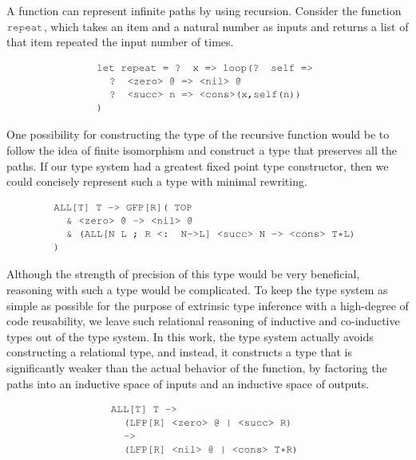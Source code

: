 \documentclass[acmsmall]{acmart}
\theoremstyle{definition}
\begin{document}
A function can represent infinite paths by using recursion.
Consider the function $\J{repeat}$, which takes an item and a natural number
as inputs and returns a list of that item repeated the input number of times.

\[
  \begin{array}[t]{@{} l}
      \J{let repeat = ? x => loop(? self =>}
      \\
      \I \J{? <zero> @ => <nil> @}
      \\
      \I \J{? <succ> n => <cons>(x,self(n))}
      \\
      \J{)}
  \end{array}
\]

\noindent
One possibility for constructing the type of the recursive function would
be to follow the idea of finite isomorphism and construct a type 
that preserves all the paths. If our type system had a greatest fixed point
type constructor, then we could concisely represent such a type with minimal
rewriting.

\[
  \begin{array}[t]{@{} l}
      \J{ALL[T] T -> GFP[R]( TOP} 
      \\
      \I \J{\& <zero> @ -> <nil> @}
      \\
      \I \J{\& (ALL[N L ; R <: N->L] <succ> N -> <cons> T*L)}
      \\
      \J{)} 
  \end{array}
\]

\noindent
Although the strength of precision of this type would be very beneficial,
reasoning with such a type would be complicated. To keep the type system as
simple as possible for the purpose of extrinsic type inference with a high-degree
of code reusability, we leave such relational reasoning of inductive and co-inductive types out of
the type system. 
In this work, the type system actually avoids constructing a relational type, and instead, it
constructs a type that is significantly weaker than the actual behavior of the function,
by factoring the paths into an inductive space of inputs and an inductive space of outputs. 

\[
  \begin{array}[t]{@{} l}
      \J{ALL[T] T ->} 
      \\
      \I \J{(LFP[R] <zero> @ | <succ> R)}
      \\
      \I \J{->}
      \\
      \I \J{(LFP[R] <nil> @ | <cons> T*R)}
  \end{array}
\]
\end{document}
